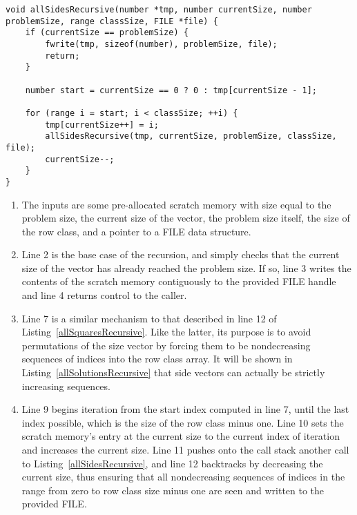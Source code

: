 \begin{lstlisting}[caption={Recursively computing all side vectors of a certain size.},label={allSidesRecursive}]
void allSidesRecursive(number *tmp, number currentSize, number problemSize, range classSize, FILE *file) {
    if (currentSize == problemSize) {
        fwrite(tmp, sizeof(number), problemSize, file);
        return;
    }

    number start = currentSize == 0 ? 0 : tmp[currentSize - 1];

    for (range i = start; i < classSize; ++i) {
        tmp[currentSize++] = i;
        allSidesRecursive(tmp, currentSize, problemSize, classSize, file);
        currentSize--;
    }
}
\end{lstlisting}

\begin{enumerate}
\item The inputs are some pre-allocated scratch memory with size equal to the problem size, the current size of the vector, the problem size itself, the size of the row class, and a pointer to a FILE data structure.
\item Line 2 is the base case of the recursion, and simply checks that the current size of the vector has already reached the problem size. If so, line 3 writes the contents of the scratch memory contiguously to the provided FILE handle and line 4 returns control to the caller.
\addtocounter{enumi}{4}
\item Line 7 is a similar mechanism to that described in line 12 of Listing~\ref{allSquaresRecursive}. Like the latter, its purpose is to avoid permutations of the size vector by forcing them to be nondecreasing sequences of indices into the row class array. It will be shown in Listing~\ref{allSolutionsRecursive} that side vectors can actually be strictly increasing sequences.
\addtocounter{enumi}{1}
\item Line 9 begins iteration from the start index computed in line 7, until the last index possible, which is the size of the row class minus one. Line 10 sets the scratch memory's entry at the current size to the current index of iteration and increases the current size. Line 11 pushes onto the call stack another call to Listing~\ref{allSidesRecursive}, and line 12 backtracks by decreasing the current size, thus ensuring that all nondecreasing sequences of indices in the range from zero to row class size minus one are seen and written to the provided FILE.
\end{enumerate}

